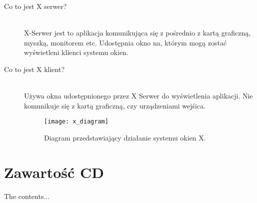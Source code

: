 \begin{appendices}
\begin{description}
	\item[Co to jest X serwer?] \hfill \\
		X-Serwer jest to aplikacja komunikująca się z pośrednio z kartą graficzną, myszką, monitorem etc. Udostępnia okno na, którym mogą zostać wyświetleni klienci systemu okien.
	\item[Co to jest X klient?] \hfill \\
Używa okna udostępnionego przez X Serwer do wyświetlenia aplikacji. Nie komunikuje się z kartą graficzną, czy urządzeniami wejśica.

\begin{figure}[H]
\begin{center}
    \texttt{[image: x\_diagram]}
\end{center}
\caption{Diagram przedstawiający działanie systemu okien X.}
\label{fig:}
\end{figure}

		
\end{description}



\section{Zawartość CD}

The contents...

\end{appendices}
